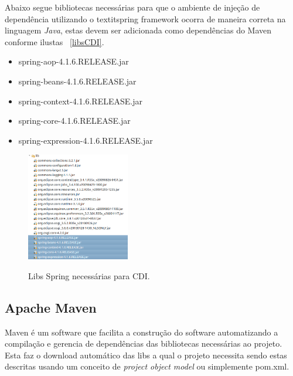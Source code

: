 Abaixo segue bibliotecas necessárias para que o ambiente de injeção de dependência utilizando o textit{spring framework} \cite{SPRING_REF} ocorra de maneira correta na linguagem \textit{Java}, estas devem ser adicionada como dependências do Maven conforme ilustas ~\ref{libsCDI}.
\begin{itemize}
	\item spring-aop-4.1.6.RELEASE.jar
	\item spring-beans-4.1.6.RELEASE.jar
	\item spring-context-4.1.6.RELEASE.jar
	\item spring-core-4.1.6.RELEASE.jar
	\item spring-expression-4.1.6.RELEASE.jar
\end{itemize}
\clearpage

\begin{figure}[h]
	\center
	\includegraphics[width=0.4\textwidth]{Imagens/libsSpring}
	\label{fig:libsCDI}
	\caption{Libs Spring necessárias para CDI.}
\end{figure}



\clearpage
\subsection{Apache Maven}
Maven é um software que facilita a construção do software automatizando a compilação e gerencia de dependências das bibliotecas necessárias ao projeto. Esta faz o download automático das libs a qual o projeto necessita sendo estas descritas usando um conceito de \textit{project object model} ou simplemente pom.xml.


